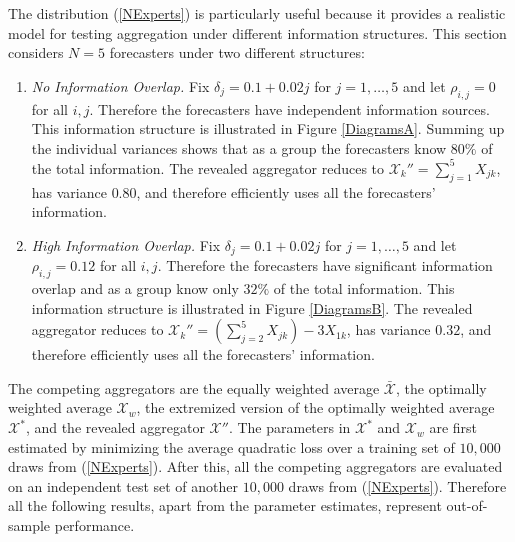 \documentclass[12pt]{article}
\theoremstyle{definition}
\theoremstyle{definition}
\begin{document}
The distribution (\ref{NExperts}) is particularly useful because it provides a realistic model for testing aggregation under different information structures. This section considers $N = 5$ forecasters under two different structures:
\begin{enumerate}
\item[] \textit{No Information Overlap.}  Fix $\delta_j = 0.1 + 0.02j$ for $j = 1, \dots, 5$ and let $\rho_{i,j} = 0$ for all $i,j$. Therefore the forecasters have independent information sources. This information structure is illustrated in Figure \ref{DiagramsA}. Summing up the individual variances shows that as a group the forecasters know $80\%$ of the total information. The revealed aggregator reduces to $\mathcal{X}_k'' = \sum_{j=1}^5 X_{jk}$, has variance $0.80$, and therefore efficiently uses all the forecasters' information.


\item[] \textit{High Information Overlap.} Fix $\delta_j = 0.1 + 0.02j$ for $j = 1, \dots, 5$ and let $\rho_{i,j} = 0.12$ for all $i,j$. Therefore the forecasters have significant information overlap and as a group know only $32\%$ of the total information. This information structure is illustrated in Figure \ref{DiagramsB}. The revealed aggregator reduces to $ \mathcal{X}_k'' = \left( \sum_{j=2}^5 X_{jk} \right) - 3X_{1k}$, has variance $0.32$, and therefore efficiently uses all the forecasters' information.
\end{enumerate}


The competing aggregators are the equally weighted average $\bar{\mathcal{X}}$, the optimally weighted average $\mathcal{X}_w$, the extremized version of the optimally weighted average $\mathcal{X}^*$, and the revealed aggregator $\mathcal{X}''$. The parameters in $\mathcal{X}^*$ and  $\mathcal{X}_w$ are first estimated by minimizing the average quadratic loss over a training set of $10,000$ draws from (\ref{NExperts}).  After this, all the competing aggregators are evaluated on an independent test set of another $10,000$ draws from (\ref{NExperts}). 
Therefore all the following results, apart from the parameter estimates, represent out-of-sample performance. 
\end{document}
